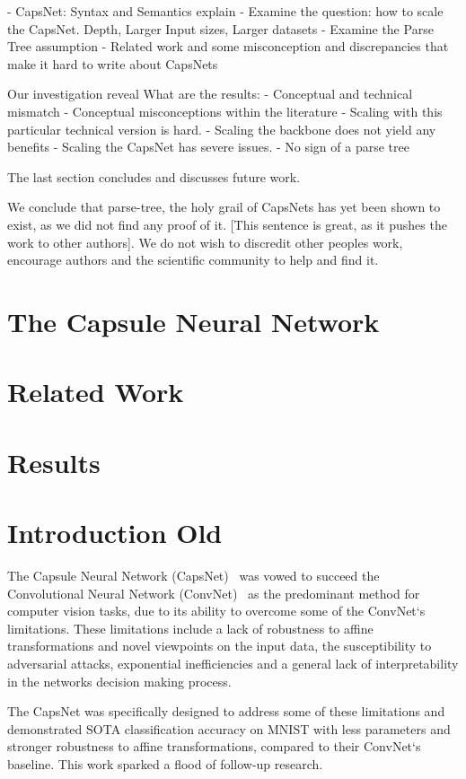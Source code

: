 \documentclass{article}
\begin{document}
- CapsNet: Syntax and Semantics explain
- Examine the question: how to scale the CapsNet. Depth, Larger Input sizes, Larger datasets
- Examine the Parse Tree assumption
- Related work and some misconception and discrepancies that make it hard to write about CapsNets

Our investigation reveal
What are the results:
- Conceptual and technical mismatch
- Conceptual misconceptions within the literature
- Scaling with this particular technical version is hard.
- Scaling the backbone does not yield any benefits
- Scaling the CapsNet has severe issues.
- No sign of a parse tree

The last section concludes and discusses future work.

We conclude that parse-tree, the holy grail of CapsNets has yet been shown to exist, as we did not find any proof of it. [This sentence is great, as it pushes the work to other authors].
We do not wish to discredit other peoples work, encourage authors and the scientific community to help and find it.

\section{The Capsule Neural Network}
\section{Related Work}
\section{Results}
\section{Introduction Old}

The Capsule Neural Network (CapsNet)~\cite{nips/SabourFH17} was vowed to succeed the Convolutional Neural Network (ConvNet)~\cite{neco/LeCunBDHHHJ89} as the predominant method for computer vision tasks, due to its ability to overcome some of the ConvNet`s limitations. %
These limitations include
a lack of robustness to affine transformations and novel viewpoints on the input data, 
the susceptibility to adversarial attacks,
exponential inefficiencies
and a general lack of interpretability in the networks decision making process. %

The CapsNet was specifically designed to address some of these limitations and demonstrated SOTA classification accuracy on MNIST with less parameters and stronger robustness to affine transformations, compared to their ConvNet`s baseline. This work sparked a flood of follow-up research.
\end{document}
